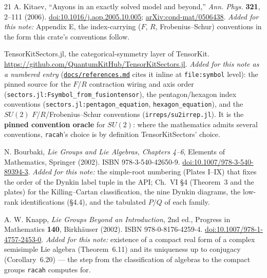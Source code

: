 \documentclass[11pt,a4paper]{article}
\theoremstyle{plain}
\theoremstyle{definition}
\newcommand{\code}[1]{\texttt{#1}}
\newcommand{\refsmd}{\href{https://github.com/Ryo-wtnb11/racah/blob/main/docs/references.md}{\code{docs/references.md}}}
\begin{document}
\begin{thebibliography}{21}
 A. Kitaev, ``Anyons in an exactly solved model and beyond,''
\emph{Ann. Phys.} \textbf{321}, 2--111 (2006).
\href{https://doi.org/10.1016/j.aop.2005.10.005}{doi:10.1016/j.aop.2005.10.005};
\href{https://arxiv.org/abs/cond-mat/0506438}{arXiv:cond-mat/0506438}.
\emph{Added for this note:} Appendix E, the index-carrying ($F$, $R$,
Frobenius--Schur) conventions in the form this crate's conventions follow.

 TensorKitSectors.jl, the categorical-symmetry layer of TensorKit.
\url{https://github.com/QuantumKitHub/TensorKitSectors.jl}.
\emph{Added for this note as a numbered entry} (\refsmd{} cites it inline at
\code{file:symbol} level): the pinned source for the $F$/$R$ contraction wiring
and axis order (\code{sectors.jl:Fsymbol\_from\_fusiontensor}), the
pentagon/hexagon index conventions
(\code{sectors.jl:pentagon\_equation}, \code{hexagon\_equation}), and the
$SU(2)$ $F$/$R$/Frobenius--Schur conventions
(\code{irreps/su2irrep.jl}). It is the \textbf{pinned convention oracle} for
$SU(2)$: where the mathematics admits several conventions, \code{racah}'s
choice is by definition TensorKitSectors' choice.

 N. Bourbaki, \emph{Lie Groups and Lie Algebras,
Chapters 4--6}, Elements of Mathematics, Springer (2002).
ISBN 978-3-540-42650-9.
\href{https://doi.org/10.1007/978-3-540-89394-3}{doi:10.1007/978-3-540-89394-3}.
\emph{Added for this note:} the simple-root numbering (Plates I--IX) that fixes
the order of the Dynkin label tuple in the API; Ch.~VI \S4 (Theorem~3 and the
plates) for the Killing--Cartan classification, the nine Dynkin diagrams, the
low-rank identifications (\S4.4), and the tabulated $P/Q$ of each family.

 A. W. Knapp, \emph{Lie Groups Beyond an Introduction},
2nd ed., Progress in Mathematics \textbf{140}, Birkh\"auser (2002).
ISBN 978-0-8176-4259-4.
\href{https://doi.org/10.1007/978-1-4757-2453-0}{doi:10.1007/978-1-4757-2453-0}.
\emph{Added for this note:} existence of a compact real form of a complex
semisimple Lie algebra (Theorem~6.11) and its uniqueness up to conjugacy
(Corollary~6.20) --- the step from the classification of algebras to the
compact groups \code{racah} computes for.

\end{thebibliography}
\end{document}
